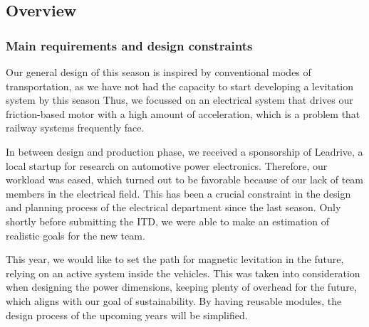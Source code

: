 \subsection{Overview}
\subsubsection*{Main requirements and design constraints}
\par Our general design of this season is inspired by conventional modes of transportation,
as we have not had the capacity to start developing a levitation system by this season
Thus, we focussed on an electrical system that drives our friction-based motor with
a high amount of acceleration, which is a problem that railway systems frequently face.

\par In between design and production phase, we received a sponsorship of Leadrive,
a local startup for research on automotive power electronics.
Therefore, our workload was eased, which turned out to be favorable
because of our lack of team members in the electrical field. This has been a crucial
constraint in the design and planning process of the electrical department
since the last season. Only shortly before submitting the ITD, we were able to make an estimation of
realistic goals for the new team.

\par This year, we would like to set the path for magnetic levitation in the future, relying on an active system
inside the vehicles. This was taken into consideration when designing the power dimensions,
keeping plenty of overhead for the future, which aligns with our goal of sustainability.
By having reusable modules, the design process of the upcoming years will be simplified.

